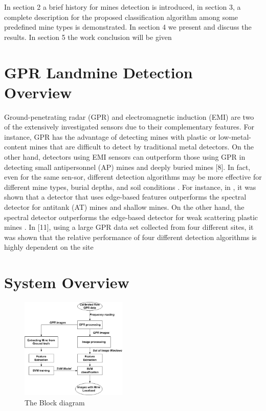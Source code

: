 \documentclass[conference]{IEEEtran}
\begin{document}
In  section  2  a  brief  history  for  mines  detection  is  introduced,  in  section  3,  a  complete  description  for  the  proposed  classification  algorithm  among  some  predefined  mine types is  demonstrated. In section  4 we present  and  discuss the results. In section 5 the work conclusion will be  given

\section{GPR Landmine Detection Overview}

 Ground-penetrating radar (GPR) and electromagnetic induction (EMI) are two of the extensively investigated sensors due to their complementary features. For instance, GPR has the advantage of detecting mines with plastic or low-metal-content mines that are difficult to detect by traditional metal detectors. On the other hand, detectors using EMI sensors can outperform those using GPR in detecting small antipersonnel (AP) mines and deeply buried mines [8]. In fact, even for the same sen-sor, different detection algorithms may be more effective for different mine types, burial depths, and soil conditions \cite{Frigui2010}. For instance, in \cite{Frigui2010}, it was shown that a detector that uses edge-based features \cite{Frigui2009} outperforms the spectral detector \cite{Ho2008} for antitank (AT) mines and shallow mines. On the other hand, the spectral detector outperforms the edge-based detector for weak scattering plastic mines \cite{Ho2008}. In [11], using a large GPR data set collected from four different sites, it was shown that the relative performance of four different detection algorithms is highly dependent on the site

\section {System Overview}

 \begin{figure}
\centering
\label{fig:block}
\includegraphics[width=0.45\textwidth]{images/BlockDiagram.jpg}
 \caption{The Block diagram }
\end{figure}
\end{document}
